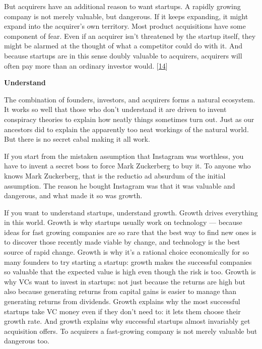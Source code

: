 But acquirers have an additional reason to want startups.  A rapidly
growing company is not merely valuable, but dangerous.  If it keeps
expanding, it might expand into the acquirer's own territory.  Most
product acquisitions have some component of fear.  Even if an
acquirer isn't threatened by the startup itself, they might be
alarmed at the thought of what a competitor could do with it.  And
because startups are in this sense doubly valuable to acquirers,
acquirers will often pay more than an ordinary investor would. 
[\href{\#f14n}{14}]


\textbf{Understand}

The combination of founders, investors, and acquirers forms a natural
ecosystem.  It works so well that those who don't understand it are
driven to invent conspiracy theories to explain how neatly things
sometimes turn out.  Just as our ancestors did to explain the
apparently too neat workings of the natural world.  But there is
no secret cabal making it all work.

If you start from the mistaken assumption that Instagram was
worthless, you have to invent a secret boss to force Mark Zuckerberg
to buy it.  To anyone who knows Mark Zuckerberg, that is the reductio
ad absurdum of the initial assumption.  The reason he bought Instagram
was that it was valuable and dangerous, and what made it so was
growth.

If you want to understand startups, understand growth.  Growth
drives everything in this world.  Growth is why startups usually
work on technology --- because ideas for fast growing companies are
so rare that the best way to find new ones is to discover those
recently made viable by change, and technology is the best source
of rapid change.  Growth is why it's a rational choice economically
for so many founders to try starting a startup: growth makes the
successful companies so valuable that the expected value is high
even though the risk is too.  Growth is why VCs want to invest in
startups: not just because the returns are high but also because
generating returns from capital gains is easier to manage than
generating returns from dividends.  Growth explains why the most
successful startups take VC money even if they don't need to: it
lets them choose their growth rate.  And growth explains why
successful startups almost invariably get acquisition offers.  To
acquirers a fast-growing company is not merely valuable but dangerous
too.

